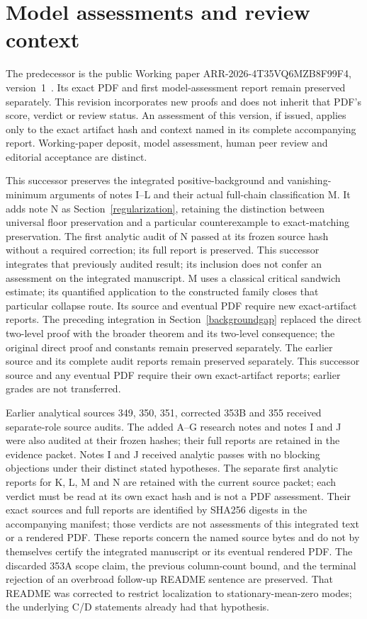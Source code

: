 \documentclass[11pt]{article}
\begin{document}
\section{Model assessments and review context}
The predecessor is the public Working paper ARR-2026-4T35VQ6MZB8F99F4, version~1~\cite{predecessor}. Its exact PDF and first model-assessment report remain preserved separately. This revision incorporates new proofs and does not inherit that PDF's score, verdict or review status. An assessment of this version, if issued, applies only to the exact artifact hash and context named in its complete accompanying report. Working-paper deposit, model assessment, human peer review and editorial acceptance are distinct.

This successor preserves the integrated positive-background and vanishing-minimum arguments of notes I--L and their actual full-chain classification M. It adds note N as Section~\ref{regularization}, retaining the distinction between universal floor preservation and a particular counterexample to exact-matching preservation. The first analytic audit of N passed at its frozen source hash without a required correction; its full report is preserved. This successor integrates that previously audited result; its inclusion does not confer an assessment on the integrated manuscript. M uses a classical critical sandwich estimate; its quantified application to the constructed family closes that particular collapse route. Its source and eventual PDF require new exact-artifact reports. The preceding integration in Section~\ref{backgroundgap} replaced the direct two-level proof with the broader theorem and its two-level consequence; the original direct proof and constants remain preserved separately. The earlier source and its complete audit reports remain preserved separately. This successor source and any eventual PDF require their own exact-artifact reports; earlier grades are not transferred.

Earlier analytical sources 349, 350, 351, corrected 353B and 355 received separate-role source audits. The added A--G research notes and notes I and J were also audited at their frozen hashes; their full reports are retained in the evidence packet. Notes I and J received analytic passes with no blocking objections under their distinct stated hypotheses. The separate first analytic reports for K, L, M and N are retained with the current source packet; each verdict must be read at its own exact hash and is not a PDF assessment. Their exact sources and full reports are identified by SHA256 digests in the accompanying manifest; those verdicts are not assessments of this integrated text or a rendered PDF. These reports concern the named source bytes and do not by themselves certify the integrated manuscript or its eventual rendered PDF. The discarded 353A scope claim, the previous column-count bound, and the terminal rejection of an overbroad follow-up README sentence are preserved. That README was corrected to restrict localization to stationary-mean-zero modes; the underlying C/D statements already had that hypothesis.
\end{document}
